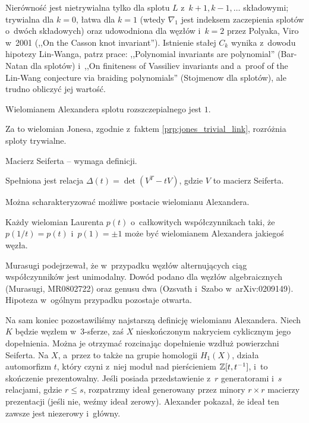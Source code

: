 Nierówność jest nietrywialna tylko dla splotu $L$ z~$k+1, k-1, \ldots$ składowymi; trywialna dla $k = 0$, łatwa dla $k=1$ (wtedy $\nabla_1$ jest indeksem zaczepienia splotów o~dwóch składowych) oraz udowodniona dla węzłów i~$k=2$ przez Polyaka, Viro w~2001 (,,On the Casson knot invariant'').
Istnienie stałej $C_k$ wynika z~dowodu hipotezy Lin-Wanga, patrz prace:
,,Polynomial invariants are polynomial'' (Bar-Natan dla splotów) i~,,On finiteness of Vassiliev invariants and a~proof of the Lin-Wang conjecture via braiding polynomials'' (Stojmenow dla splotów), ale trudno obliczyć jej wartość.


\begin{proposition}
	Wielomianem Alexandera splotu rozszczepialnego jest $1$.
\end{proposition}

Za to wielomian Jonesa, zgodnie z~faktem \ref{prp:jones_trivial_link}, rozróżnia sploty trywialne.

Macierz Seiferta -- wymaga definicji.
\begin{proposition}
	Spełniona jest relacja $\Delta(t)=\det(V^T-tV)$, gdzie $V$ to macierz Seiferta.
\end{proposition}

Można scharakteryzować możliwe postacie wielomianu Alexandera.

\begin{proposition}[Hosokowa, 1958]
	Każdy wielomian Laurenta $p(t)$ o~całkowitych współczynnikach taki, że $p(1/t) = p(t)$ i~$p(1) = \pm 1$ może być wielomianem Alexandera jakiegoś węzła.
\end{proposition}

Murasugi podejrzewał, że w~przypadku węzłów alternujących ciąg współczynników jest unimodalny.
Dowód podano dla węzłów algebraicznych (Murasugi, MR0802722) oraz genusu dwa (Ozsvath i~Szabo w~arXiv:0209149).
Hipoteza w~ogólnym przypadku pozostaje otwarta.


Na sam koniec pozostawiliśmy najstarszą definicję wielomianu Alexandera.
Niech $K$ będzie węzłem w~3-sferze, zaś $X$ nieskończonym nakryciem cyklicznym jego dopełnienia.
Można je otrzymać rozcinając dopełnienie wzdłuż powierzchni Seiferta.
Na $X$, a~przez to także na grupie homologii $H_1(X)$, działa automorfizm $t$, który czyni z~niej moduł nad pierścieniem $\mathbb Z[t, t^{-1}]$, i~to skończenie prezentowalny.
Jeśli posiada przedstawienie z~$r$ generatorami i~$s$ relacjami, gdzie $r \le s$, rozpatrzmy ideał generowany przez minory $r \times r$ macierzy prezentacji (jeśli nie, weźmy ideał zerowy).
Alexander pokazał, że ideał ten zawsze jest niezerowy i~główny.

